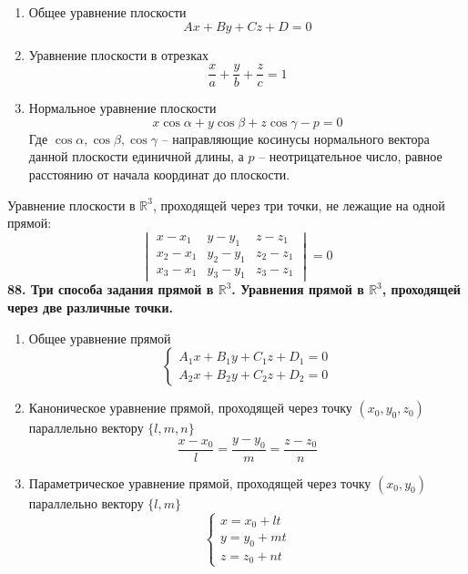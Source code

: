 \documentclass{article}
\begin{document}
   \begin{enumerate}
       \item Общее уравнение плоскости \\
               $$
                   Ax + By + Cz + D = 0
               $$
       \item Уравнение плоскости в отрезках\\
       $$
           \frac{x}{a} + \frac{y}{b} + \frac{z}{c} = 1
       $$
       \item Нормальное уравнение плоскости\\
       $$
           x\cos\alpha + y\cos\beta + z\cos\gamma - p = 0
       $$
       Где $\cos\alpha, \cos\beta, \cos\gamma$ -- направляющие косинусы нормального вектора данной плоскости единичной длины, а $p$ -- неотрицательное число, равное расстоянию от начала координат до плоскости.
   \end{enumerate}
   Уравнение плоскости в $\mathbb{R}^3$, проходящей через три точки, не лежащие на одной прямой:
   $$
       \begin{vmatrix}
           x - x_1 & y - y_1 & z - z_1 \\
           x_2 - x_1 & y_2 - y_1 & z_2 - z_1 \\
           x_3 - x_1 & y_3 - y_1 & z_3 - z_1
       \end{vmatrix} = 0
   $$
\newline
\newline
\textbf{88. Три способа задания прямой в $\mathbb{R}^3$. Уравнения прямой в $\mathbb{R}^3$, проходящей через две различные точки.}
   \begin{enumerate}
       \item Общее уравнение прямой \\
           $$
               \begin{cases}
                   A_1x + B_1y + C_1z + D_1 = 0 \\
                   A_2x + B_2y + C_2z + D_2 = 0
               \end{cases}
           $$
       \item Каноническое уравнение прямой, проходящей через точку $(x_0, y_0, z_0)$ параллельно вектору $\{l, m, n\}$ \\
           $$
               \frac{x - x_0}{l} = \frac{y - y_0}{m} = \frac{z - z_0}{n}
           $$
       \item Параметрическое уравнение прямой, проходящей через точку $(x_0, y_0)$ параллельно вектору $\{l, m\}$ \\
           $$
               \begin{cases}
                   x = x_0 + lt \\
                   y = y_0 + mt \\
                   z = z_0 + nt
               \end{cases}
           $$
   \end{enumerate}
\end{document}
